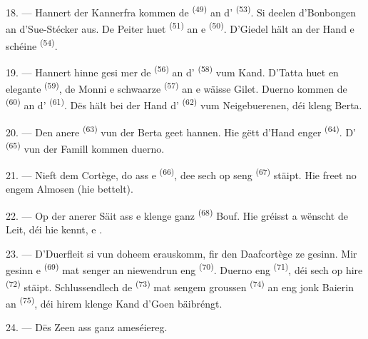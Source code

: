 18. --- Hannert der Kannerfra kommen de  \textsuperscript{(49)} an
d' \textsuperscript{(53)}. Si deelen d'Bonbongen an d'Sue-Stécker aus.
De Peiter huet  \textsuperscript{(51)} an e 
\textsuperscript{(50)}. D'Giedel hält an der Hand e schéine 
\textsuperscript{(54)}.

19. --- Hannert hinne gesi mer de  \textsuperscript{(56)} an
d' \textsuperscript{(58)} vum Kand. D'Tatta huet en elegante
 \textsuperscript{(59)}, de Monni e schwaarze 
\textsuperscript{(57)} an e wäisse Gilet. Duerno kommen de 
\textsuperscript{(60)} an d' \textsuperscript{(61)}. Dës hält bei der
Hand d' \textsuperscript{(62)} vum Neigebuerenen, déi kleng Berta.

20. --- Den anere  \textsuperscript{(63)} vun der Berta geet hannen.
Hie gëtt d'Hand enger  \textsuperscript{(64)}. D'
\textsuperscript{(65)} vun der Famill kommen duerno.

\VUsaut{4.6mm}
\VUsaut{3.4mm}

21. --- Nieft dem Cortège, do ass e  \textsuperscript{(66)}, dee sech
op seng  \textsuperscript{(67)} stäipt. Hie freet no engem Almosen (hie
bettelt).

22. --- Op der anerer Säit ass e klenge ganz 
\textsuperscript{(68)} Bouf. Hie gréisst a wënscht de Leit, déi hie kennt, e
.

23. --- D'Duerfleit si vun doheem erauskomm, fir den Daafcortège ze gesinn. Mir
gesinn e  \textsuperscript{(69)} mat senger  an
niewendrun eng  \textsuperscript{(70)}. Duerno eng 
\textsuperscript{(71)}, déi sech op hire  \textsuperscript{(72)}
stäipt. Schlussendlech de  \textsuperscript{(73)} mat sengem
groussen  \textsuperscript{(74)} an eng jonk Baierin an
 \textsuperscript{(75)}, déi hirem klenge Kand d'Goen bäibréngt.

24. --- Dës Zeen ass ganz ameséiereg.

\VUsaut{4.0mm}
\VUsaut{3.0mm}


